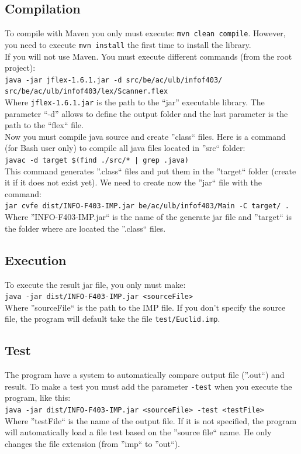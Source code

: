 \documentclass[a4paper,11pt]{article}
\begin{document}
  \subsection{Compilation}
    To compile with Maven you only must execute: \verb|mvn clean compile|.  However, you need to execute \verb|mvn install| the first time to install the library.\\
    If you will not use Maven.  You must execute different commands (from the root project):\\
    \verb|java -jar jflex-1.6.1.jar -d src/be/ac/ulb/infof403/ src/be/ac/ulb/infof403/lex/Scanner.flex|\\
    Where \verb|jflex-1.6.1.jar| is the path to the ``jar'' executable library.  The parameter ``-d'' allows to define the output folder and the last parameter is the path to the ``flex`` file.\\
    Now you must compile java source and create ''class`` files.  Here is a command (for Bash user only) to compile all java files located in ''src`` folder:\\
    \verb=javac -d target $(find ./src/* | grep .java)=\\
    This command generates ''.class`` files and put them in the ''target`` folder (create it if it does not exist yet).  We need to create now the ''jar`` file with the command:\\
    \verb|jar cvfe dist/INFO-F403-IMP.jar be/ac/ulb/infof403/Main -C target/ .|\\
    Where ''INFO-F403-IMP.jar`` is the name of the generate jar file and ''target`` is the folder where are located the ''.class`` files.
    
    
  \subsection{Execution}
    To execute the result jar file, you only must make:\\
    \verb|java -jar dist/INFO-F403-IMP.jar <sourceFile>|\\
    Where ''sourceFile`` is the path to the IMP file.  If you don't specify the source file, the program will default take the file \verb|test/Euclid.imp|.
    
  \subsection{Test}
    The program have a system to automatically compare output file (''.out``) and result.  To make a test you must add the parameter \verb|-test| when you execute the program, like this:\\
    \verb|java -jar dist/INFO-F403-IMP.jar <sourceFile> -test <testFile>|\\
    Where ''testFile`` is the name of the output file.  If it is not specified, the program will automatically load a file test based on the ''source file`` name.  He only changes the file extension (from ''imp`` to ''out``).
    
\end{document}
